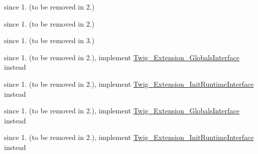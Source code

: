 \begin{DoxyRefList}
\item[\label{deprecated__deprecated000009}%
\hypertarget{deprecated__deprecated000009}{}%
Member \hyperlink{classTwig__Environment_a13f0132c47718c48c49ce1e3f48c65f0}{Twig\+\_\+\+Environment\+:\+:remove\+Extension} (\$name)]since 1. (to be removed in 2.)  
\item[\label{deprecated__deprecated000011}%
\hypertarget{deprecated__deprecated000011}{}%
Member \hyperlink{classTwig__Environment_a8d01536c697ba2f5d8526ba4af4ceed4}{Twig\+\_\+\+Environment\+:\+:write\+Cache\+File} (\$file, \$content)]since 1. (to be removed in 2.)  
\item[\label{deprecated__deprecated000012}%
\hypertarget{deprecated__deprecated000012}{}%
Class \hyperlink{interfaceTwig__ExistsLoaderInterface}{Twig\+\_\+\+Exists\+Loader\+Interface} ]since 1. (to be removed in 3.)  
\item[\label{deprecated__deprecated000014}%
\hypertarget{deprecated__deprecated000014}{}%
Member \hyperlink{classTwig__Extension_aec459d056e5afa3b4a3feb2b67e2190a}{Twig\+\_\+\+Extension\+:\+:get\+Globals} ()]since 1. (to be removed in 2.), implement \hyperlink{interfaceTwig__Extension__GlobalsInterface}{Twig\+\_\+\+Extension\+\_\+\+Globals\+Interface} instead  
\item[\label{deprecated__deprecated000013}%
\hypertarget{deprecated__deprecated000013}{}%
Member \hyperlink{classTwig__Extension_af923cb6771b0d2df5d623af14d8fa3b2}{Twig\+\_\+\+Extension\+:\+:init\+Runtime} (\hyperlink{classTwig__Environment}{Twig\+\_\+\+Environment} \$environment)]since 1. (to be removed in 2.), implement \hyperlink{interfaceTwig__Extension__InitRuntimeInterface}{Twig\+\_\+\+Extension\+\_\+\+Init\+Runtime\+Interface} instead  
\item[\label{deprecated__deprecated000016}%
\hypertarget{deprecated__deprecated000016}{}%
Member \hyperlink{interfaceTwig__ExtensionInterface_af9ed562412969b31cd66ce77b97c5ab7}{Twig\+\_\+\+Extension\+Interface\+:\+:get\+Globals} ()]since 1. (to be removed in 2.), implement \hyperlink{interfaceTwig__Extension__GlobalsInterface}{Twig\+\_\+\+Extension\+\_\+\+Globals\+Interface} instead  
\item[\label{deprecated__deprecated000015}%
\hypertarget{deprecated__deprecated000015}{}%
Member \hyperlink{interfaceTwig__ExtensionInterface_a9ce76d2e0412fb7c4bafa77e9b9ce44d}{Twig\+\_\+\+Extension\+Interface\+:\+:init\+Runtime} (\hyperlink{classTwig__Environment}{Twig\+\_\+\+Environment} \$environment)]since 1. (to be removed in 2.), implement \hyperlink{interfaceTwig__Extension__InitRuntimeInterface}{Twig\+\_\+\+Extension\+\_\+\+Init\+Runtime\+Interface} instead  

\end{DoxyRefList}
